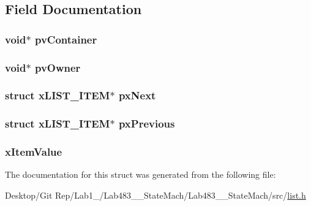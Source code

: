 \subsection{Field Documentation}
\hypertarget{structx_l_i_s_t___i_t_e_m_a96701cdfbb91bd7b690f188d03bf03b1}{
\subsubsection[{pv\-Container}]{\setlength{\rightskip}{0pt plus 5cm}void$\ast$ pv\-Container}}\label{structx_l_i_s_t___i_t_e_m_a96701cdfbb91bd7b690f188d03bf03b1}
\hypertarget{structx_l_i_s_t___i_t_e_m_aeb54d184fbcccb5748e66cb2426e3b3f}{
\subsubsection[{pv\-Owner}]{\setlength{\rightskip}{0pt plus 5cm}void$\ast$ pv\-Owner}}\label{structx_l_i_s_t___i_t_e_m_aeb54d184fbcccb5748e66cb2426e3b3f}
\hypertarget{structx_l_i_s_t___i_t_e_m_aa3188b77b81a666e2f670d1942c37d90}{
\subsubsection[{px\-Next}]{\setlength{\rightskip}{0pt plus 5cm}struct {\bf x\-L\-I\-S\-T\-\_\-\-I\-T\-E\-M}$\ast$ px\-Next}}\label{structx_l_i_s_t___i_t_e_m_aa3188b77b81a666e2f670d1942c37d90}
\hypertarget{structx_l_i_s_t___i_t_e_m_aeda19153a902efa73e3ee8662824d471}{
\subsubsection[{px\-Previous}]{\setlength{\rightskip}{0pt plus 5cm}struct {\bf x\-L\-I\-S\-T\-\_\-\-I\-T\-E\-M}$\ast$ px\-Previous}}\label{structx_l_i_s_t___i_t_e_m_aeda19153a902efa73e3ee8662824d471}
\hypertarget{structx_l_i_s_t___i_t_e_m_a83bf16246a7893527d5ea5d2aa7cc4bf}{
\subsubsection[{x\-Item\-Value}]{ x\-Item\-Value}}\label{structx_l_i_s_t___i_t_e_m_a83bf16246a7893527d5ea5d2aa7cc4bf}


The documentation for this struct was generated from the following file\-:\begin{DoxyCompactItemize}
\item 
Desktop/\-Git Rep/\-Lab1\-\_/\-Lab483\-\_\-\_\-\-State\-Mach/\-Lab483\-\_\-\_\-\-State\-Mach/src/\hyperlink{list_8h}{list.\-h}\end{DoxyCompactItemize}
